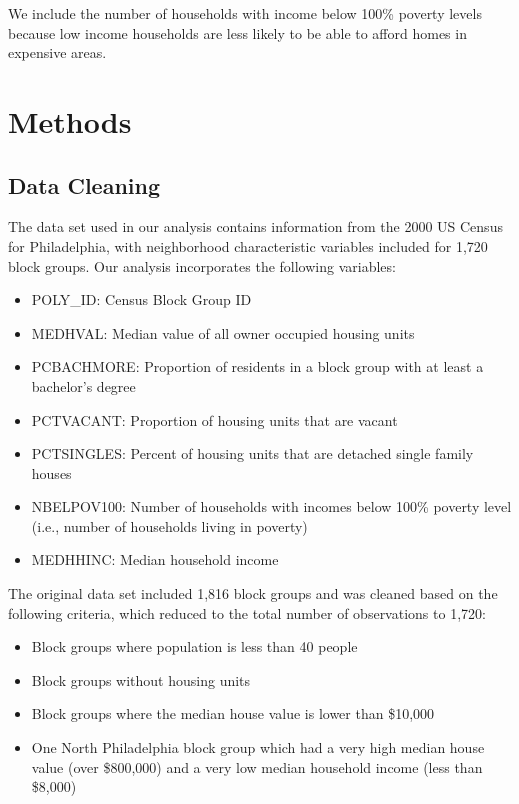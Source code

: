 \documentclass[
]{article}
\providecommand{\tightlist}{%
  \setlength{\itemsep}{0pt}\setlength{\parskip}{0pt}}
\begin{document}
We include the number of households with income below 100\% poverty
levels because low income households are less likely to be able to
afford homes in expensive areas.

\hypertarget{methods}{%
\section{Methods}\label{methods}}

\hypertarget{data-cleaning}{%
\subsection{Data Cleaning}\label{data-cleaning}}

The data set used in our analysis contains information from the 2000 US
Census for Philadelphia, with neighborhood characteristic variables
included for 1,720 block groups. Our analysis incorporates the following
variables:

\begin{itemize}
\tightlist
\item
  POLY\_ID: Census Block Group ID
\item
  MEDHVAL: Median value of all owner occupied housing units
\item
  PCBACHMORE: Proportion of residents in a block group with at least a
  bachelor's degree
\item
  PCTVACANT: Proportion of housing units that are vacant
\item
  PCTSINGLES: Percent of housing units that are detached single family
  houses
\item
  NBELPOV100: Number of households with incomes below 100\% poverty
  level (i.e., number of households living in poverty)
\item
  MEDHHINC: Median household income
\end{itemize}

The original data set included 1,816 block groups and was cleaned based
on the following criteria, which reduced to the total number of
observations to 1,720:

\begin{itemize}
\tightlist
\item
  Block groups where population is less than 40 people
\item
  Block groups without housing units
\item
  Block groups where the median house value is lower than \$10,000
\item
  One North Philadelphia block group which had a very high median house
  value (over \$800,000) and a very low median household income (less
  than \$8,000)
\end{itemize}
\end{document}
